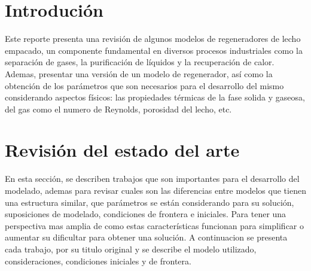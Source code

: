 \documentclass[12pt,letterpaper,final]{article}%
\begin{document}
\section{Introduci\'on}
Este reporte presenta una revisión de algunos modelos de regeneradores de lecho empacado, un componente fundamental en diversos procesos industriales como la separación de gases, la purificación de líquidos y la recuperación de calor. Ademas, presentar una versión de un modelo de regenerador, así como la obtención de los parámetros que son necesarios para el desarrollo del mismo considerando aspectos físicos: las propiedades térmicas de la fase solida y gaseosa, del gas como el numero de Reynolds, porosidad del lecho, etc.

\section{Revisión del estado del arte}
En esta sección, se describen trabajos que son importantes para el desarrollo del modelado, ademas para revisar cuales son las diferencias entre modelos que tienen una estructura similar, que parámetros se están considerando para su solución, suposiciones de modelado, condiciones de frontera e iniciales. Para tener una perspectiva mas amplia de como estas características funcionan para simplificar o aumentar su dificultar para obtener una solución. A continuacion se presenta cada trabajo, por su titulo original y se describe el modelo utilizado, consideraciones, condiciones iniciales y de frontera. 
\end{document}
